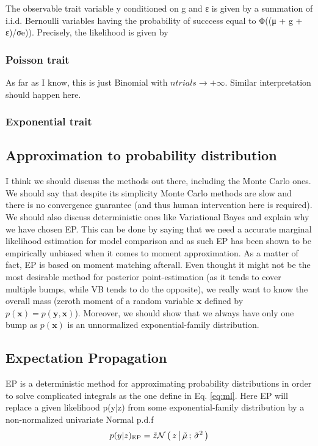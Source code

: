 The observable trait variable y conditioned on g and ε is given by a summation
of i.i.d. Bernoulli variables having the probability of succcess equal to Φ((μ +
g + ε)/σe)). Precisely, the likelihood is given by

\subsubsection{Poisson trait}

As far as I know, this is just Binomial with $ntrials \rightarrow +\infty$.
Similar interpretation should happen here.

\subsubsection{Exponential trait}



\subsection{Approximation to probability distribution}

I think we should discuss the methods out there, including the Monte Carlo ones.
We should say that despite its simplicity Monte Carlo methods are slow and there
is no convergence guarantee (and thus human intervention here is required). We
should also discuss deterministic ones like Variational Bayes and explain why we
have chosen EP. This can be done by saying that we need a accurate marginal
likelihood estimation for model comparison and as such EP has been shown to be
empirically unbiased when it comes to moment approximation. As a matter of fact,
EP is based on moment matching afterall. Even thought it might not be the most
desirable method for posterior point-estimation (as it tends to cover multiple
bumps, while VB tends to do the opposite), we really want to know the overall
mass (zeroth moment of a random variable $\mathbf x$ defined by $p(\mathbf x) =
p(\mathbf y, \mathbf x)$). Moreover, we should show that we always have only one
bump as $p(\mathbf x)$ is an unnormalized exponential-family distribution.

\subsection{Expectation Propagation}

EP is a deterministic method for approximating probability distributions in
order to solve complicated integrals as the one define in Eq. \eqref{eq:ml}.
Here EP will replace a given likelihood p(y|z) from some exponential-family
distribution by a non-normalized univariate Normal p.d.f
\begin{align*}
  p(y|z)_{\text{EP}} = \tilde z \mathcal{N}\left(\, { {z} \, \big| \, {\tilde \mu} } \,;\, { {\tilde \sigma^2} } \,\right)
\end{align*}


